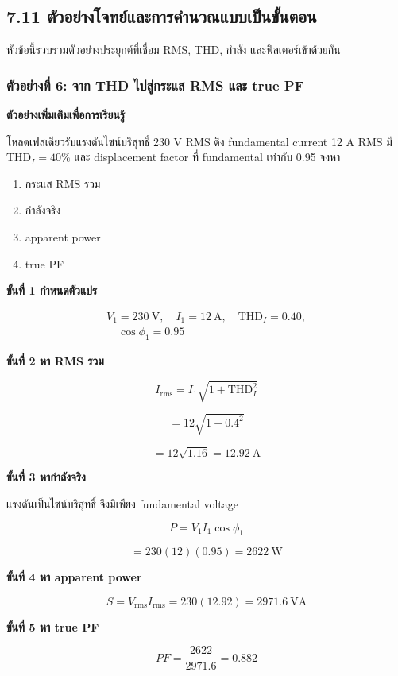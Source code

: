 \subsection{7.11 ตัวอย่างโจทย์และการคำนวณแบบเป็นขั้นตอน}

หัวข้อนี้รวบรวมตัวอย่างประยุกต์ที่เชื่อม RMS, THD, กำลัง และฟิลเตอร์เข้าด้วยกัน

\subsubsection{ตัวอย่างที่ 6: จาก THD ไปสู่กระแส RMS และ true PF}

\textbf{ตัวอย่างเพิ่มเติมเพื่อการเรียนรู้}

โหลดเฟสเดียวรับแรงดันไซน์บริสุทธิ์ 230 V RMS ดึง fundamental current 12 A RMS มี $\mathrm{THD}_I=40\%$ และ displacement factor ที่ fundamental เท่ากับ 0.95 จงหา

\begin{enumerate}
    \item กระแส RMS รวม
    \item กำลังจริง
    \item apparent power
    \item true PF
\end{enumerate}

\textbf{ขั้นที่ 1 กำหนดตัวแปร}

\[
\begin{aligned}
    V_1=230\ \text{V},\quad I_1=12\ \text{A},\quad \mathrm{THD}_I=0.40, \\
    \quad \cos\phi_1=0.95
\end{aligned}
\]

\textbf{ขั้นที่ 2 หา RMS รวม}

\[
I_{\mathrm{rms}}=I_1\sqrt{1+\mathrm{THD}_I^2}
\]

\[
=12\sqrt{1+0.4^2}
\]

\[
=12\sqrt{1.16}=12.92\ \text{A}
\]

\textbf{ขั้นที่ 3 หากำลังจริง}

แรงดันเป็นไซน์บริสุทธิ์ จึงมีเพียง fundamental voltage

\[
P=V_1I_1\cos\phi_1
\]

\[
=230(12)(0.95)=2622\ \text{W}
\]

\textbf{ขั้นที่ 4 หา apparent power}

\[
S=V_{\mathrm{rms}}I_{\mathrm{rms}}=230(12.92)=2971.6\ \text{VA}
\]

\textbf{ขั้นที่ 5 หา true PF}

\[
PF=\frac{2622}{2971.6}=0.882
\]


